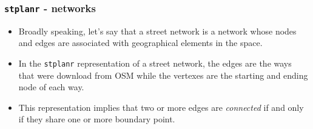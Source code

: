 \documentclass[c,10pt,pdftex]{beamer}
\begin{document}
\begin{frame}
  \frametitle{\texttt{stplanr} - networks}
  \vspace{-0.75cm}
  \begin{itemize}
    \setlength\itemsep{1em}
    \item Broadly speaking, let's say that a street network is a network whose nodes and edges are associated with geographical elements in the space. 
    \item In the \texttt{stplanr} representation of a street network, the edges are the ways that were download from OSM while the vertexes are the starting and ending node of each way. 
    \item This representation implies that two or more edges are \textit{connected} if and only if they share one or more boundary point. 
  \end{itemize}
\end{frame}
\end{document}
